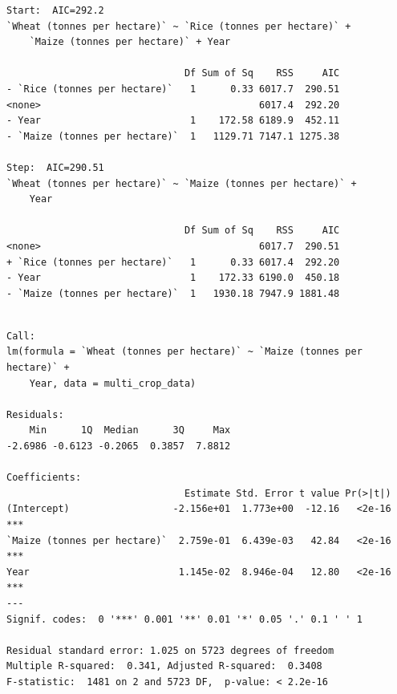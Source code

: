 \documentclass[
  letterpaper,
]{book}
\begin{document}
\begin{verbatim}
Start:  AIC=292.2
`Wheat (tonnes per hectare)` ~ `Rice (tonnes per hectare)` + 
    `Maize (tonnes per hectare)` + Year

                               Df Sum of Sq    RSS     AIC
- `Rice (tonnes per hectare)`   1      0.33 6017.7  290.51
<none>                                      6017.4  292.20
- Year                          1    172.58 6189.9  452.11
- `Maize (tonnes per hectare)`  1   1129.71 7147.1 1275.38

Step:  AIC=290.51
`Wheat (tonnes per hectare)` ~ `Maize (tonnes per hectare)` + 
    Year

                               Df Sum of Sq    RSS     AIC
<none>                                      6017.7  290.51
+ `Rice (tonnes per hectare)`   1      0.33 6017.4  292.20
- Year                          1    172.33 6190.0  450.18
- `Maize (tonnes per hectare)`  1   1930.18 7947.9 1881.48
\end{verbatim}

\begin{verbatim}

Call:
lm(formula = `Wheat (tonnes per hectare)` ~ `Maize (tonnes per hectare)` + 
    Year, data = multi_crop_data)

Residuals:
    Min      1Q  Median      3Q     Max 
-2.6986 -0.6123 -0.2065  0.3857  7.8812 

Coefficients:
                               Estimate Std. Error t value Pr(>|t|)    
(Intercept)                  -2.156e+01  1.773e+00  -12.16   <2e-16 ***
`Maize (tonnes per hectare)`  2.759e-01  6.439e-03   42.84   <2e-16 ***
Year                          1.145e-02  8.946e-04   12.80   <2e-16 ***
---
Signif. codes:  0 '***' 0.001 '**' 0.01 '*' 0.05 '.' 0.1 ' ' 1

Residual standard error: 1.025 on 5723 degrees of freedom
Multiple R-squared:  0.341, Adjusted R-squared:  0.3408 
F-statistic:  1481 on 2 and 5723 DF,  p-value: < 2.2e-16
\end{verbatim}
\end{document}
